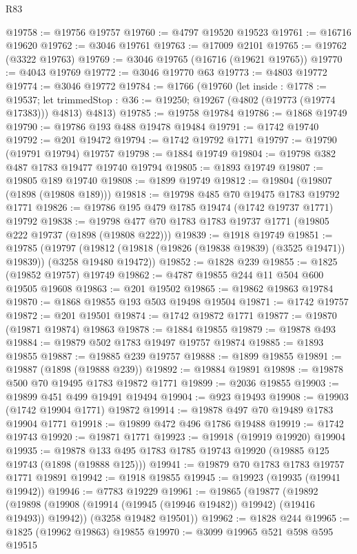 \begin{lexlean}{R83}
\begin{coremodule}
@19758 := @19756 @19757
@19760 := @4797 @19520 @19523
@19761 := @16716 @19620
@19762 := @3046 @19761
@19763 := @17009 @2101
@19765 := @19762 (@3322 @19763)
@19769 := @3046 @19765 (@16716 (@19621 @19765))
@19770 := @4043 @19769
@19772 := @3046 @19770 @63
@19773 := @4803 @19772
@19774 := @3046 @19772
@19784 := @1766
    (@19760
      (let inside : @1778 := @19537;
      let trimmedStop : @36 := @19250; @19267 (@4802 (@19773 (@19774 @17383))) @4813)
      @4813)
@19785 := @19758 @19784
@19786 := @1868 @19749
@19790 := @19786 @193 @488 @19478 @19484
@19791 := @1742 @19740
@19792 := @201 @19472
@19794 := @1742 @19792 @1771
@19797 := @19790 (@19791 @19794) @19757
@19798 := @1884 @19749
@19804 := @19798 @382 @487 @1783 @19477 @19740 @19794
@19805 := @1893 @19749
@19807 := @19805 @189 @19740
@19808 := @1899 @19749
@19812 := @19804 (@19807 (@1898 (@19808 @189)))
@19818 := @19798 @485 @70 @19475 @1783 @19792 @1771
@19826 := @19786 @195 @479 @1785 @19474 (@1742 @19737 @1771) @19792
@19838 := @19798 @477 @70 @1783 @1783 @19737 @1771 (@19805 @222 @19737 (@1898 (@19808 @222)))
@19839 := @1918 @19749
@19851 := @19785
    (@19797 (@19812 (@19818 (@19826 (@19838 @19839) (@3525 @19471)) @19839)) (@3258 @19480 @19472))
@19852 := @1828 @239
@19855 := @1825 (@19852 @19757) @19749
@19862 := @4787 @19855 @244 @11 @504 @600 @19505 @19608
@19863 := @201 @19502
@19865 := @19862 @19863 @19784
@19870 := @1868 @19855 @193 @503 @19498 @19504
@19871 := @1742 @19757
@19872 := @201 @19501
@19874 := @1742 @19872 @1771
@19877 := @19870 (@19871 @19874) @19863
@19878 := @1884 @19855
@19879 := @19878 @493
@19884 := @19879 @502 @1783 @19497 @19757 @19874
@19885 := @1893 @19855
@19887 := @19885 @239 @19757
@19888 := @1899 @19855
@19891 := @19887 (@1898 (@19888 @239))
@19892 := @19884 @19891
@19898 := @19878 @500 @70 @19495 @1783 @19872 @1771
@19899 := @2036 @19855
@19903 := @19899 @451 @499 @19491 @19494
@19904 := @923 @19493
@19908 := @19903 (@1742 @19904 @1771) @19872
@19914 := @19878 @497 @70 @19489 @1783 @19904 @1771
@19918 := @19899 @472 @496 @1786 @19488
@19919 := @1742 @19743
@19920 := @19871 @1771
@19923 := @19918 (@19919 @19920) @19904
@19935 := @19878 @133 @495 @1783 @1785 @19743 @19920 (@19885 @125 @19743 (@1898 (@19888 @125)))
@19941 := @19879 @70 @1783 @1783 @19757 @1771 @19891
@19942 := @1918 @19855
@19945 := @19923 (@19935 (@19941 @19942))
@19946 := @7783 @19229
@19961 := @19865
    (@19877
      (@19892 (@19898 (@19908 (@19914 (@19945 (@19946 @19482)) @19942) (@19416 @19493)) @19942))
      (@3258 @19482 @19501))
@19962 := @1828 @244
@19965 := @1825 (@19962 @19863) @19855
@19970 := @3099 @19965 @521 @598 @595 @19515

\end{coremodule}
\end{lexlean}
